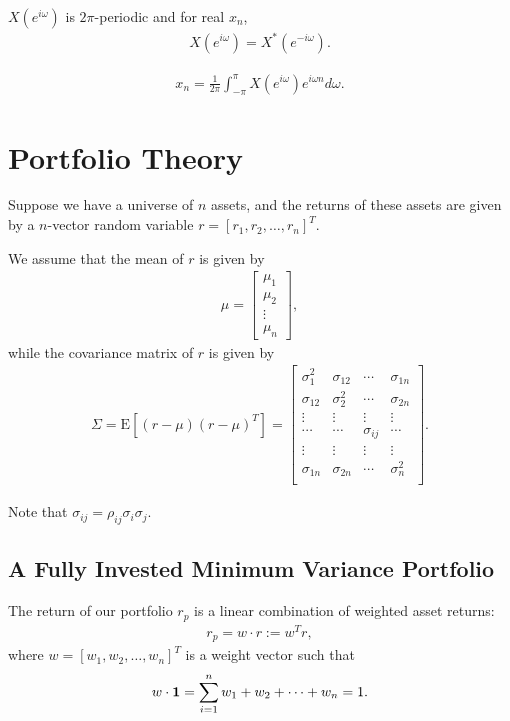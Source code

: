 \documentclass{amsart}
\theoremstyle{plain}
\numberwithin{equation}{section}
\begin{document}
$X(e^{i\omega})$ is $2\pi$-periodic and for real $x_n$,
\begin{align*}
X(e^{i\omega}) = X^*(e^{-i\omega}).
\end{align*}

\begin{align*}
x_n = \frac{1}{2\pi}
\int_{-\pi}^{\pi} X(e^{i\omega})e^{i\omega n} d \omega.
\end{align*}

\section{Portfolio Theory}
Suppose we have a universe of 
$n$ assets, and the returns of these assets
are given by a $n$-vector random 
variable $r =[r_1, r_2, \ldots, r_n]^T$.

We assume that the mean of $r$ is given by 
\begin{align*}
\mu = 
\begin{bmatrix}
\mu_1\\
\mu_2\\
\vdots\\
\mu_n
\end{bmatrix},
\end{align*}
while the covariance matrix of $r$ is given by
\begin{align*}
\Sigma = \mathrm{E}
\left[(r - \mu)(r-\mu)^{T}
\right] = 
\begin{bmatrix}
\sigma_1^2  & \sigma_{12} & \cdots & \sigma_{1n}\\
\sigma_{12} & \sigma_2^2  & \cdots & \sigma_{2n}\\
\vdots      & \vdots      & \vdots & \vdots \\
\cdots      & \cdots      & \sigma_{ij} & \cdots \\
\vdots      & \vdots      & \vdots & \vdots \\
\sigma_{1n} & \sigma_{2n} & \cdots & \sigma_n^2\\
\end{bmatrix}.
\end{align*}

Note that $\sigma_{ij} = \rho_{ij} \sigma_i \sigma_j$.

\subsection*{A Fully Invested Minimum Variance Portfolio}
The return of our portfolio $r_p$ is a linear combination of 
weighted asset returns:
\begin{align*}
r_p = w \cdot r := w^{T}r,
\end{align*}
where $w = [w_1, w_2, \ldots, w_n]^T$ is a weight 
vector such that \
\begin{align*}
w \cdot {\bf 1} = \sum_{i=1}^{n} w_1 + w_2 + \cdots + w_n = 1.
\end{align*}
\end{document}
